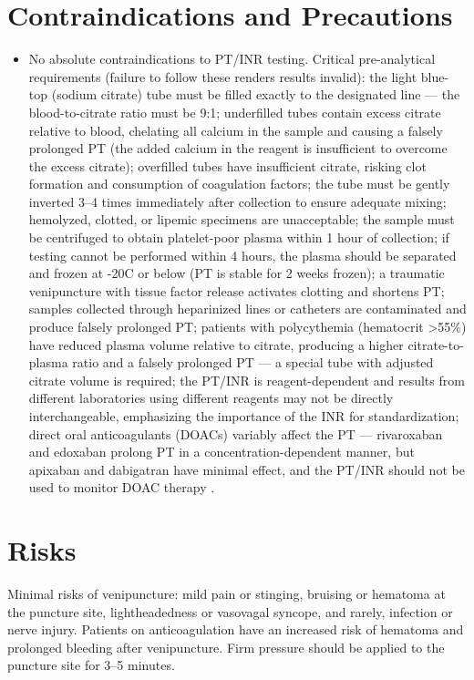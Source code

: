 \section*{Contraindications and Precautions}
\begin{itemize}
  \item No absolute contraindications to PT/INR testing. Critical pre-analytical requirements (failure to follow these renders results invalid): the light blue-top (sodium citrate) tube must be filled exactly to the designated line --- the blood-to-citrate ratio must be 9:1; underfilled tubes contain excess citrate relative to blood, chelating all calcium in the sample and causing a falsely prolonged PT (the added calcium in the reagent is insufficient to overcome the excess citrate); overfilled tubes have insufficient citrate, risking clot formation and consumption of coagulation factors; the tube must be gently inverted 3--4 times immediately after collection to ensure adequate mixing; hemolyzed, clotted, or lipemic specimens are unacceptable; the sample must be centrifuged to obtain platelet-poor plasma within 1 hour of collection; if testing cannot be performed within 4 hours, the plasma should be separated and frozen at -20\textdegree{}C or below (PT is stable for 2 weeks frozen); a traumatic venipuncture with tissue factor release activates clotting and shortens PT; samples collected through heparinized lines or catheters are contaminated and produce falsely prolonged PT; patients with polycythemia (hematocrit >55\%) have reduced plasma volume relative to citrate, producing a higher citrate-to-plasma ratio and a falsely prolonged PT --- a special tube with adjusted citrate volume is required; the PT/INR is reagent-dependent and results from different laboratories using different reagents may not be directly interchangeable, emphasizing the importance of the INR for standardization; direct oral anticoagulants (DOACs) variably affect the PT --- rivaroxaban and edoxaban prolong PT in a concentration-dependent manner, but apixaban and dabigatran have minimal effect, and the PT/INR should not be used to monitor DOAC therapy \cite{kitchen2021international}.
\end{itemize}
\section*{Risks}
Minimal risks of venipuncture: mild pain or stinging, bruising or hematoma at the puncture site, lightheadedness or vasovagal syncope, and rarely, infection or nerve injury. Patients on anticoagulation have an increased risk of hematoma and prolonged bleeding after venipuncture. Firm pressure should be applied to the puncture site for 3--5 minutes.

